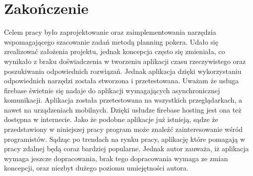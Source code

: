 \chapter*{Zakończenie}

Celem pracy było zaprojektowanie oraz zaimplementowania narzędzia wspomagającego szacowanie zadań metodą planning pokera.
Udało się zrealizować założenia projektu, jednak koncepcja często się zmieniała,
co wynikało z braku doświadczenia w tworzeniu aplikacji czasu rzeczywistego oraz poszukiwania odpowiednich rozwiązań.
Jednak aplikacja dzięki wykorzystaniu odpowiednich narzędzi została stworzona i przetestowana.
Uważam że usługa firebase świetnie się nadaje do aplikacji wymagających asynchronicznej komunikacji.
Aplikacja została przetestowana na wszystkich przeglądarkach, a nawet na urządzeniach mobilnych.
Dzięki usłudze firebase hosting jest ona też dostępna w internecie.
Jako że podobne aplikacje już istnieją,
sądze że przedstawiony w niniejszej pracy program może znaleźć zainteresowanie wśród programistów.
Sądząc po trendach na rynku pracy, aplikację które pomagają w pracy zdalnej będą coraz bardziej popularne.
Jednak autor zauważa, iż aplikacja wymaga jeszcze dopracowania, brak tego dopracowania wymaga ze zmian koncepcji,
oraz niezbyt dużego poziomu umiejętności autora.